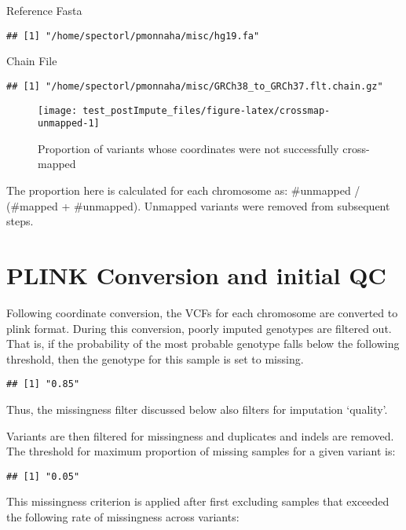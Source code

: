 \documentclass[]{article}
\begin{document}
Reference Fasta

\begin{verbatim}
## [1] "/home/spectorl/pmonnaha/misc/hg19.fa"
\end{verbatim}

Chain File

\begin{verbatim}
## [1] "/home/spectorl/pmonnaha/misc/GRCh38_to_GRCh37.flt.chain.gz"
\end{verbatim}

\begin{figure}[H]

{\centering \texttt{[image: test\_postImpute\_files/figure-latex/crossmap-unmapped-1]} 

}

\caption{Proportion of variants whose coordinates were not successfully cross-mapped}\label{fig:crossmap-unmapped}
\end{figure}

The proportion here is calculated for each chromosome as: \#unmapped /
(\#mapped + \#unmapped). Unmapped variants were removed from subsequent
steps. \newpage

\hypertarget{plink-conversion-and-initial-qc}{%
\section{PLINK Conversion and initial
QC}\label{plink-conversion-and-initial-qc}}

Following coordinate conversion, the VCFs for each chromosome are
converted to plink format. During this conversion, poorly imputed
genotypes are filtered out. That is, if the probability of the most
probable genotype falls below the following threshold, then the genotype
for this sample is set to missing.

\begin{verbatim}
## [1] "0.85"
\end{verbatim}

Thus, the missingness filter discussed below also filters for imputation
`quality'.

Variants are then filtered for missingness and duplicates and indels are
removed. The threshold for maximum proportion of missing samples for a
given variant is:

\begin{verbatim}
## [1] "0.05"
\end{verbatim}

This missingness criterion is applied after first excluding samples that
exceeded the following rate of missingness across variants:
\end{document}

